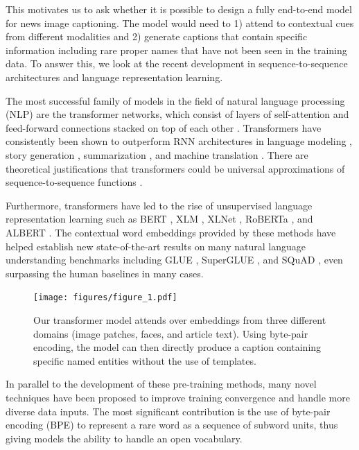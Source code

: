 \documentclass[10pt,twocolumn,letterpaper]{article}
\begin{document}
This motivates us to ask whether it is possible to design a fully end-to-end
model for news image captioning. The model would need to 1) attend to
contextual cues from different modalities and 2) generate captions that contain
specific information including rare proper names that have not been seen in the
training data. To answer this, we look at the recent development in
sequence-to-sequence architectures and language representation learning.

The most successful family of models in the field of natural language
processing (NLP) are the transformer networks, which consist of layers of
self-attention and feed-forward connections stacked on top of each other
\cite{Vaswani2017AttentionIA}. Transformers have consistently been shown to
outperform RNN architectures in language modeling \cite{Radford2019LanguageMA},
story generation \cite{Fan2018HierarchicalNS}, summarization
\cite{Subramanian2019OnEA}, and machine translation \cite{Bojar2018Findings}.
There are theoretical justifications that transformers could be universal
approximations of sequence-to-sequence functions \cite{Anonymous2020AreTU}.

Furthermore, transformers have led to the rise of unsupervised language
representation learning such as BERT \cite{Devlin2019BERT}, XLM
\cite{Lample2019CrosslingualLM}, XLNet \cite{Yang2019XLNetGA}, RoBERTa
\cite{Liu2019RoBERTaAR}, and ALBERT \cite{Lan2019ALBERT}. The contextual word
embeddings provided by these methods have helped establish new state-of-the-art
results on many natural language understanding benchmarks including GLUE
\cite{Wang2019GLUE}, SuperGLUE \cite{Wang2019SuperGLUEAS}, and SQuAD
\cite{Rajpurkar2016SQuAD, Rajpurkar2018KnowWY}, even surpassing the human
baselines in many cases.

\begin{figure}[t]
   \begin{center}
      \texttt{[image: figures/figure\_1.pdf]}
   \end{center}
      \caption{Our transformer model attends over embeddings from three
      different domains (image patches, faces, and article text). Using
      byte-pair encoding, the model can then directly produce a caption
      containing specific named entities without the use of templates.}
   \label{fig:long}
   \label{fig:onecol}
\end{figure}

In parallel to the development of these pre-training methods, many novel
techniques have been proposed to improve training convergence and handle more
diverse data inputs. The most significant contribution is the use of byte-pair
encoding (BPE) \cite{Sennrich2015NeuralMT} to represent a rare word as a
sequence of subword units, thus giving models the ability to handle an open
vocabulary.
\end{document}
